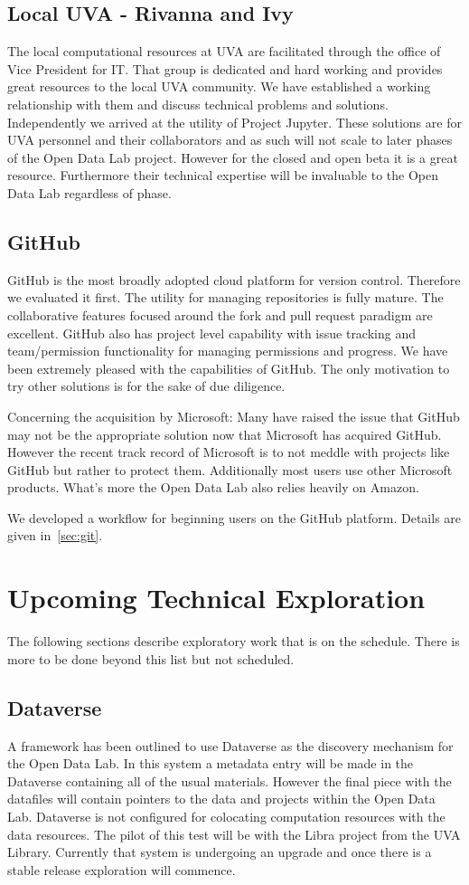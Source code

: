 \subsection{Local UVA - Rivanna and Ivy}
The local computational resources at UVA are facilitated through the office of Vice President for IT. That group is dedicated and hard working and provides great resources to the local UVA community. We have established a working relationship with them and discuss technical problems and solutions. Independently we arrived at the utility of Project Jupyter.
These solutions are for UVA personnel and their collaborators and as such will not scale to later phases of the Open Data Lab project. However for the closed and open beta it is a great resource. Furthermore their technical expertise will be invaluable to the Open Data Lab regardless of phase.

\subsection{GitHub}
GitHub is the most broadly adopted cloud platform for version control. Therefore we evaluated it first. The utility for managing repositories is fully mature. The collaborative features focused around the fork and pull request paradigm are excellent. GitHub also has project level capability with issue tracking and team/permission functionality for managing permissions and progress. We have been extremely pleased with the capabilities of GitHub. The only motivation to try other solutions is for the sake of due diligence.

Concerning the acquisition by Microsoft: Many have raised the issue that GitHub may not be the appropriate solution now that Microsoft has acquired GitHub. However the recent track record of Microsoft is to not meddle with projects like GitHub but rather to protect them. Additionally most users use other Microsoft products. What's more the Open Data Lab also relies heavily on Amazon.

We developed a workflow for beginning users on the GitHub platform. Details are given in~\ref{sec:git}.

\section{Upcoming Technical Exploration}
The following sections describe exploratory work that is on the schedule. There is more to be done beyond this list but not scheduled.
\subsection{Dataverse}
A framework has been outlined to use Dataverse as the discovery mechanism for the Open Data Lab. In this system a metadata entry will be made in the Dataverse containing all of the usual materials. However the final piece with the datafiles will contain pointers to the data and projects within the Open Data Lab. Dataverse is not configured for colocating computation resources with the data resources. The pilot of this test will be with the Libra project from the UVA Library. Currently that system is undergoing an upgrade and once there is a stable release exploration will commence.
